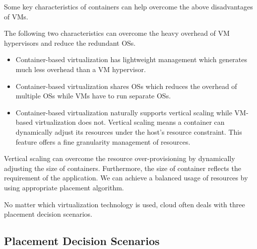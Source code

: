 Some key characteristics of containers can help overcome the above disadvantages of VMs.

The following two characteristics can overcome the heavy overhead of VM hypervisors and reduce the redundant OSs.
\begin{itemize}
	\item Container-based virtualization has lightweight management which generates much less overhead than a VM hypervisor. 
	\item Container-based virtualization shares OSs which reduces the overhead of multiple OSs while VMs have to run separate OSs.

	\item Container-based virtualization naturally supports vertical scaling while VM-based virtualization does not. Vertical scaling means a container can dynamically adjust its resources under the host's resource constraint. This feature offers a fine granularity management of resources. 

\end{itemize}

	Vertical scaling can overcome the resource over-provisioning by dynamically adjusting the size of containers. Furthermore, the size of container reflects the requirement of the application. We can achieve a balanced usage of resources by using appropriate placement algorithm.


 No matter which virtualization technology is used, cloud often deals with three placement decision scenarios. 




\subsection{Placement Decision Scenarios}
\label{sec:scenarios}


